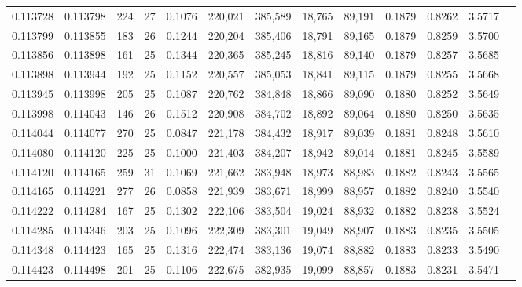 \begin{tabular}{rrrrrrrrrrrrr}
0.113728 & 0.113798 & 224 &  27 &                                     0.1076 & 220,021 & 385,589 &  18,765 &  89,191 & 0.1879 & 0.8262 & 3.5717 \\
0.113799 & 0.113855 & 183 &  26 &                                     0.1244 & 220,204 & 385,406 &  18,791 &  89,165 & 0.1879 & 0.8259 & 3.5700 \\
0.113856 & 0.113898 & 161 &  25 &                                     0.1344 & 220,365 & 385,245 &  18,816 &  89,140 & 0.1879 & 0.8257 & 3.5685 \\
0.113898 & 0.113944 & 192 &  25 &                                     0.1152 & 220,557 & 385,053 &  18,841 &  89,115 & 0.1879 & 0.8255 & 3.5668 \\
0.113945 & 0.113998 & 205 &  25 &                                     0.1087 & 220,762 & 384,848 &  18,866 &  89,090 & 0.1880 & 0.8252 & 3.5649 \\
0.113998 & 0.114043 & 146 &  26 &                                     0.1512 & 220,908 & 384,702 &  18,892 &  89,064 & 0.1880 & 0.8250 & 3.5635 \\
0.114044 & 0.114077 & 270 &  25 &                                     0.0847 & 221,178 & 384,432 &  18,917 &  89,039 & 0.1881 & 0.8248 & 3.5610 \\
0.114080 & 0.114120 & 225 &  25 &                                     0.1000 & 221,403 & 384,207 &  18,942 &  89,014 & 0.1881 & 0.8245 & 3.5589 \\
0.114120 & 0.114165 & 259 &  31 &                                     0.1069 & 221,662 & 383,948 &  18,973 &  88,983 & 0.1882 & 0.8243 & 3.5565 \\
0.114165 & 0.114221 & 277 &  26 &                                     0.0858 & 221,939 & 383,671 &  18,999 &  88,957 & 0.1882 & 0.8240 & 3.5540 \\
0.114222 & 0.114284 & 167 &  25 &                                     0.1302 & 222,106 & 383,504 &  19,024 &  88,932 & 0.1882 & 0.8238 & 3.5524 \\
0.114285 & 0.114346 & 203 &  25 &                                     0.1096 & 222,309 & 383,301 &  19,049 &  88,907 & 0.1883 & 0.8235 & 3.5505 \\
0.114348 & 0.114423 & 165 &  25 &                                     0.1316 & 222,474 & 383,136 &  19,074 &  88,882 & 0.1883 & 0.8233 & 3.5490 \\
0.114423 & 0.114498 & 201 &  25 &                                     0.1106 & 222,675 & 382,935 &  19,099 &  88,857 & 0.1883 & 0.8231 & 3.5471 \\

\end{tabular}
